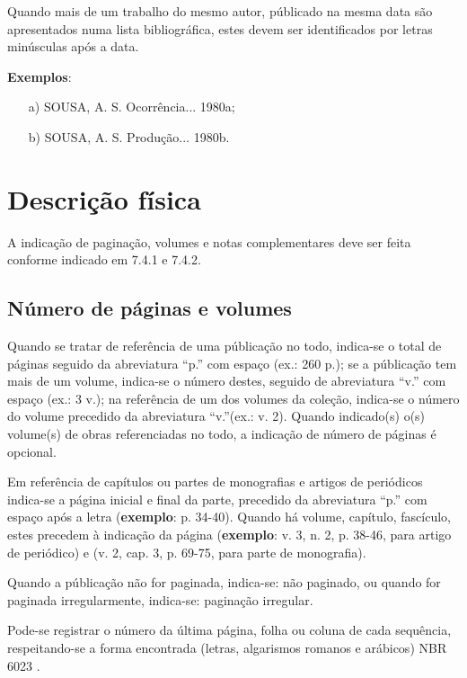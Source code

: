 Quando mais de um trabalho do mesmo autor, públicado na mesma data são apresentados numa lista bibliográfica, estes devem ser identificados por letras minúsculas após a data.

\begin{exemplomanual}
\textbf{Exemplos}:

\begin{enumerate}[a)]
  \item[a)] SOUSA, A. S. Ocorrência... 1980a;
  \item[b)] SOUSA, A. S. Produção... 1980b. 
\end{enumerate}
\end{exemplomanual}


\section{Descrição física}

A indicação de paginação, volumes e notas complementares deve ser feita conforme indicado em 7.4.1 e 7.4.2.


\subsection{Número de páginas e volumes}

Quando se tratar de referência de uma públicação no todo, indica-se o total de páginas seguido da abreviatura ``p.'' com espaço (ex.: 260 p.); se a públicação tem mais de um volume, indica-se o número destes, seguido de abreviatura ``v.'' com espaço (ex.: 3 v.); na referência de um dos volumes da coleção, indica-se o número do volume precedido da abreviatura ``v.''(ex.: v. 2). Quando indicado(s) o(s) volume(s) de obras referenciadas no todo, a indicação de número de páginas é opcional.

Em referência de capítulos ou partes de monografias e artigos de periódicos indica-se a página inicial e final da parte, precedido da abreviatura ``p.'' com espaço após a letra (\textbf{exemplo}: p. 34-40). Quando há volume, capítulo, fascículo, estes precedem à indicação da página (\textbf{exemplo}: v. 3, n. 2, p. 38-46, para artigo de periódico) e (v. 2, cap. 3, p. 69-75, para parte de monografia).

Quando a públicação não for paginada, indica-se: não paginado, ou quando for paginada irregularmente, indica-se: paginação irregular.

Pode-se registrar o número da última página, folha ou coluna de cada sequência, respeitando-se a forma encontrada (letras, algarismos romanos e arábicos) NBR 6023 \cite{NBR6023:2002}.

